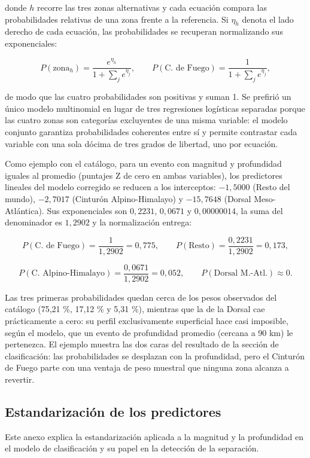 \documentclass[
  spanish,
  letterpaper,
  DIV=11,
  numbers=noendperiod]{scrartcl}
\begin{document}
donde \(h\) recorre las tres zonas alternativas y cada ecuación compara
las probabilidades relativas de una zona frente a la referencia. Si
\(\eta_h\) denota el lado derecho de cada ecuación, las probabilidades
se recuperan normalizando sus exponenciales:

\[
P(\text{zona}_h)=\frac{e^{\eta_h}}{1+\sum_{j} e^{\eta_j}},
\qquad
P(\text{C. de Fuego})=\frac{1}{1+\sum_{j} e^{\eta_j}},
\]

de modo que las cuatro probabilidades son positivas y suman 1. Se
prefirió un único modelo multinomial en lugar de tres regresiones
logísticas separadas porque las cuatro zonas son categorías excluyentes
de una misma variable: el modelo conjunto garantiza probabilidades
coherentes entre sí y permite contrastar cada variable con una sola
dócima de tres grados de libertad, uno por ecuación.

Como ejemplo con el catálogo, para un evento con magnitud y profundidad
iguales al promedio (puntajes Z de cero en ambas variables), los
predictores lineales del modelo corregido se reducen a los interceptos:
\(-1{,}5000\) (Resto del mundo), \(-2{,}7017\) (Cinturón
Alpino-Himalayo) y \(-15{,}7648\) (Dorsal Meso-Atlántica). Sus
exponenciales son \(0{,}2231\), \(0{,}0671\) y \(0{,}00000014\), la suma
del denominador es \(1{,}2902\) y la normalización entrega:

\[
P(\text{C. de Fuego})=\frac{1}{1{,}2902}=0{,}775,
\qquad
P(\text{Resto})=\frac{0{,}2231}{1{,}2902}=0{,}173,
\]

\[
P(\text{C. Alpino-Himalayo})=\frac{0{,}0671}{1{,}2902}=0{,}052,
\qquad
P(\text{Dorsal M.-Atl.})\approx 0.
\]

Las tres primeras probabilidades quedan cerca de los pesos observados
del catálogo (75,21 \%, 17,12 \% y 5,31 \%), mientras que la de la
Dorsal cae prácticamente a cero: su perfil exclusivamente superficial
hace casi imposible, según el modelo, que un evento de profundidad
promedio (cercana a 90 km) le pertenezca. El ejemplo muestra las dos
caras del resultado de la sección de clasificación: las probabilidades
se desplazan con la profundidad, pero el Cinturón de Fuego parte con una
ventaja de peso muestral que ninguna zona alcanza a revertir.

\subsection{Estandarización de los
predictores}\label{sec-anexo-estandarizacion}

Este anexo explica la estandarización aplicada a la magnitud y la
profundidad en el modelo de clasificación y su papel en la detección de
la separación.
\end{document}
